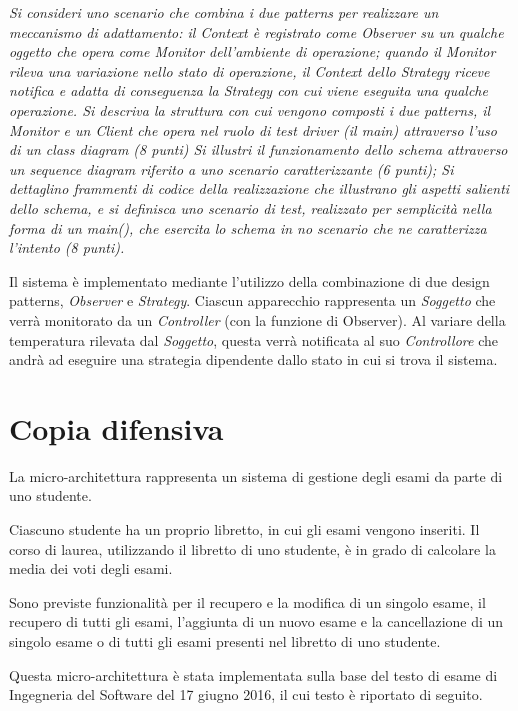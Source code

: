 \emph{Si consideri uno scenario che combina i due patterns per realizzare un meccanismo di adattamento:
il Context è registrato come Observer su un qualche oggetto che opera come Monitor dell'ambiente di operazione; quando il Monitor rileva una variazione nello stato di operazione, il Context dello Strategy riceve notifica e adatta di conseguenza la Strategy con cui viene eseguita una qualche operazione.
Si descriva la struttura con cui vengono composti i due patterns, il Monitor e un Client che opera nel ruolo di test driver (il main) attraverso l'uso di un class diagram (8 punti)
Si illustri il funzionamento dello schema attraverso un sequence diagram riferito a uno scenario caratterizzante (6 punti);
Si dettaglino frammenti di codice della realizzazione che illustrano gli aspetti salienti dello schema, e si definisca uno scenario di test, realizzato per semplicità nella forma di un main(),  che esercita lo schema in no scenario che ne caratterizza l'intento (8 punti).}

\vspace{0.5cm}

Il sistema è implementato mediante l’utilizzo della combinazione di due design patterns, \emph{Observer} e \emph{Strategy}. Ciascun apparecchio rappresenta un \emph{Soggetto} che verrà monitorato da un \emph{Controller} (con la funzione di Observer). Al variare della temperatura rilevata dal \emph{Soggetto}, questa verrà notificata al suo \emph{Controllore} che andrà ad eseguire una strategia dipendente dallo stato in cui si trova il sistema.


\section{Copia difensiva}

La micro-architettura rappresenta un sistema di gestione degli esami da parte di uno studente. 

Ciascuno studente  ha un proprio libretto, in cui gli esami vengono inseriti. Il corso di laurea, utilizzando il libretto di uno studente, è in grado di calcolare la media dei voti degli esami. 

Sono previste funzionalità per il recupero e la modifica di un singolo esame, il recupero di tutti gli esami, l'aggiunta di un nuovo esame e la cancellazione di un singolo esame o di tutti gli esami presenti nel libretto di uno studente.

Questa micro-architettura è stata implementata sulla base del testo di esame di Ingegneria del Software del 17 giugno 2016, il cui testo è riportato di seguito.


